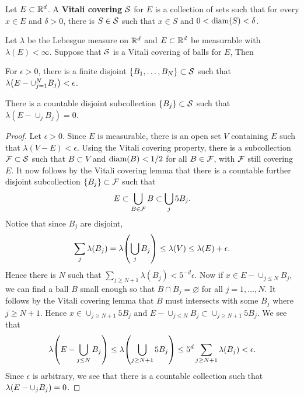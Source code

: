 \begin{definition}
    Let $E\subset\R^d$. A \textbf{Vitali covering} $\S$ for $E$ is 
    a collection of sets such that for every $x\in E$ and $\delta>0$, 
    there is $S\in \S$ such that $x\in S$ and $0<\diam{S}<\delta$.   
\end{definition}

\begin{theorem}
    Let $\lambda$ be the Lebesgue measure on $\R^d$ and $E\subset\R^d$ be measurable 
    with $\lambda(E)<\infty$. Suppose that $\S$ is a Vitali covering of balls 
    for $E$, Then 
    \begin{thmenum}
        \item For $\epsilon>0$, there is a finite disjoint $\set{B_1,\ldots,B_N}\subset\S$ 
        such that $\lambda\pth{E - \cup_{j=1}^N B_j} <\epsilon$. 
        \item There is a countable disjoint subcollection $\set{B_j}\subset\S$ 
        such that $\lambda(E - \cup_jB_j) = 0$. 
    \end{thmenum} 
\end{theorem}
\begin{proof}
    Let $\epsilon>0$. Since $E$ is measurable, there is an open set 
    $V$ containing $E$ such that $\lambda(V-E)<\epsilon$. Using the 
    Vitali covering property, there is a subcollection $\F\subset\S$ 
    such that $B\subset V$ and $\diam{B}<1/2$ for all $B\in\F$, with 
    $\F$ still covering $E$. It now follows by the Vitali covering 
    lemma that there is a countable further disjoint subcollection 
    $\set{B_j}\subset\F$ such that 
    \begin{equation*}
        E\subset\bigcup_{B\in\F}B\subset \bigcup_{j}5B_j.
    \end{equation*}
    Notice that since $B_j$ are disjoint, 
    \begin{equation*}
        \sum_{j}\lambda(B_j) = \lambda\pth{\bigcup_{j}B_j}\leq \lambda(V)\leq \lambda(E)+\epsilon. 
    \end{equation*}
    Hence there is $N$ such that $\sum_{j\geq N+1}\lambda(B_j)<5^{-d}\epsilon$. 
    Now if $x\in E-\cup_{j\leq N}B_j$, we can find a ball $B$ small enough 
    so that $B\cap B_j = \varnothing$ for all $j=1,\ldots,N$. It follows by 
    the Vitali covering lemma that $B$ must intersects with some $B_j$ 
    where $j\geq N+1$. Hence $x\in \cup_{j\geq N+1}5B_j$ and 
    $E-\cup_{j\leq N}B_j\subset\cup_{j\geq N+1}5B_j$. We see that 
    \begin{equation*}
        \lambda\pth{E-\bigcup_{j\leq N}B_j}\leq \lambda\pth{\bigcup_{j\geq N+1}5B_j} 
        \leq 5^d\sum_{j\geq N+1}\lambda(B_j) < \epsilon. 
    \end{equation*}
    Since $\epsilon$ is arbitrary, we see that there is a countable 
    collection such that $\lambda\pth{E - \cup_j B_j} = 0$.
\end{proof}

